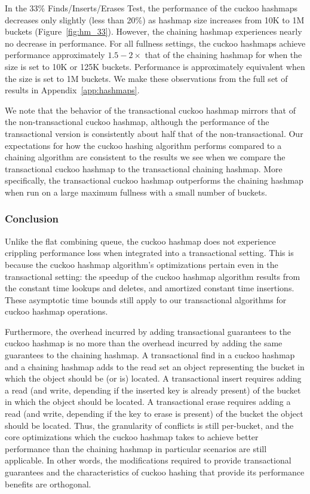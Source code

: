 In the 33\% Finds/Inserts/Erases Test, the performance of the cuckoo hashmaps decreases only slightly (less than 20\%) as hashmap size increases from 10K to 1M buckets (Figure~\ref{fig:hm_33}). However, the chaining hashmap experiences nearly no decrease in performance. For all fullness settings, the cuckoo hashmaps achieve performance approximately $1.5-2\times$ that of the chaining hashmap for when the size is set to 10K or 125K buckets. Performance is approximately equivalent when the size is set to 1M buckets. We make these observations from the full set of results in Appendix~\ref{app:hashmaps}.

We note that the behavior of the transactional cuckoo hashmap mirrors that of the non-transactional cuckoo hashmap, although the performance of the transactional version is consistently about half that of the non-transactional. Our expectations for how the cuckoo hashing algorithm performs compared to a chaining algorithm are consistent to the results we see when we compare the transactional cuckoo hashmap to the transactional chaining hashmap.
More specifically, the transactional cuckoo hashmap outperforms the chaining hashmap when run on a large maximum fullness with a small number of buckets. 

\subsubsection{Conclusion}

Unlike the flat combining queue, the cuckoo hashmap does not experience crippling performance loss when integrated into a transactional setting. This is because the cuckoo hashmap algorithm's optimizations pertain even in the transactional setting: the speedup of the cuckoo hashmap algorithm results from the constant time lookups and deletes, and amortized constant time insertions. These asymptotic time bounds still apply to our transactional algorithms for cuckoo hashmap operations.

Furthermore, the overhead incurred by adding transactional guarantees to the cuckoo hashmap is no more than the overhead incurred by adding the same guarantees to the chaining hashmap. A transactional find in a cuckoo hashmap and a chaining hashmap adds to the read set an object representing the bucket in which the object should be (or is) located.  A transactional insert requires adding a read (and write, depending if the inserted key is already present) of the bucket in which the object should be located. A transactional erase requires adding a read (and write, depending if the key to erase is present) of the bucket the object should be located. Thus, the granularity of conflicts is still per-bucket, and the core optimizations which the cuckoo hashmap takes to achieve better performance than the chaining hashmap in particular scenarios are still applicable. In other words, the modifications required to provide transactional guarantees and the characteristics of cuckoo hashing that provide its performance benefits are orthogonal.

